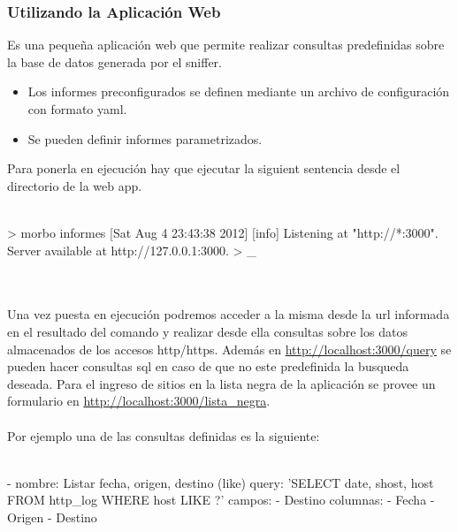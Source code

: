 \subsubsection{Utilizando la Aplicación Web}

Es una pequeña aplicación web que permite realizar consultas predefinidas sobre la base de datos generada por el sniffer. 
\begin{itemize}
	\item Los informes preconfigurados se definen mediante un archivo de configuración con formato yaml.
	\item Se pueden definir informes parametrizados.
\end{itemize}

Para ponerla en ejecución hay que ejecutar la siguient sentencia desde el directorio de la web app.
\\\\
{\small
\begin{boxedverbatim}
	> morbo informes
	[Sat Aug  4 23:43:38 2012] [info] Listening at "http://*:3000".
	Server available at http://127.0.0.1:3000.
	> _
\end{boxedverbatim}
}
\\\\
Una vez puesta en ejecución podremos acceder a la misma desde la url informada 
en el resultado del comando y realizar desde ella consultas sobre los datos 
almacenados de los accesos http/https. Además en \url{http://localhost:3000/query} se pueden hacer consultas sql en caso de que no este predefinida la busqueda deseada.
Para el ingreso de sitios en la lista negra de la aplicación se provee un formulario en \url{http://localhost:3000/lista\_negra}.
\\
\\Por ejemplo una de las consultas definidas es la siguiente: 
\\\\
	{\small
	\begin{boxedverbatim}
	- nombre: Listar fecha, origen, destino (like)
  query: 'SELECT date, shost, host FROM http_log WHERE host LIKE ?'
  campos: 
   - Destino
  columnas:
   - Fecha
   - Origen
   - Destino
	\end{boxedverbatim}
	}
